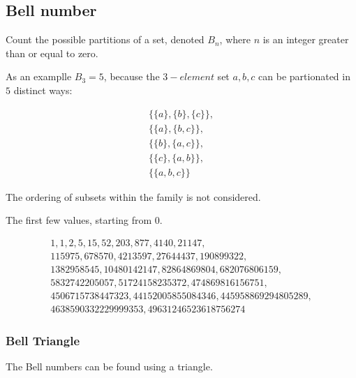 \subsection{Bell number}

Count the possible partitions of a set, denoted $B_n$, where $n$ is an integer greater than or equal to zero.

As an examplle $B_3 = 5$, because the $3-element$ set $a, b, c$ can be partionated in $5$ distinct ways:

\begin{equation}
\begin{array}{c}
        \{\{a\}, \{b\}, \{c\}\}, \\
        \{\{a\}, \{b, c\}\}, \\
        \{\{b\}, \{a, c\}\}, \\
        \{\{c\}, \{a, b\}\}, \\
        \{\{a, b, c\}\} 
\end{array}
\end{equation}

The ordering of subsets within the family is not considered.

The first few values, starting from 0.

\begin{equation}
        \begin{array}{l}
        1, 1, 2, 5, 15, 52, 203, 877, 4140, 21147, \\
        115975, 678570, 4213597, 27644437, 190899322, \\
        1382958545, 10480142147, 82864869804, 682076806159, \\
        5832742205057, 51724158235372, 474869816156751, \\ 
        4506715738447323, 44152005855084346, 445958869294805289, \\
        4638590332229999353, 49631246523618756274
        \end{array}
\end{equation}

\subsubsection{Bell Triangle}

The Bell numbers can be found using a triangle.

